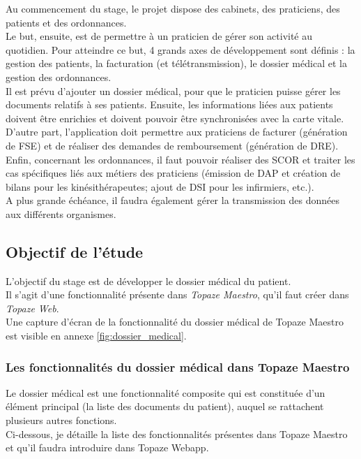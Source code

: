 Au commencement du stage, le projet dispose des cabinets, des praticiens, des patients et des ordonnances.\\

Le but, ensuite, est de permettre à un praticien de gérer son activité au quotidien. Pour atteindre ce but, 4 grands axes de développement sont définis : la gestion des patients, la facturation (et télétransmission), le dossier médical et la gestion des ordonnances.\\

Il est prévu d'ajouter un dossier médical, pour que le praticien puisse gérer les documents relatifs à ses patients. Ensuite, les informations liées aux patients doivent être enrichies et doivent pouvoir être synchronisées avec la carte vitale. D'autre part, l'application doit permettre aux praticiens de facturer (génération de \gls{FSE}) et de réaliser des demandes de remboursement (génération de \gls{DRE}). Enfin, concernant les ordonnances, il faut pouvoir réaliser des \gls{SCOR} et traiter les cas spécifiques liés aux métiers des praticiens (émission de \gls{DAP} et création de bilans pour les kinésithérapeutes; ajout de \gls{DSI} pour les infirmiers, etc.). \\

A plus grande échéance, il faudra également gérer la transmission des données aux différents organismes.

\subsection{Objectif de l'étude}

L'objectif du stage est de développer le dossier médical du patient.\\ 
Il s'agit d'une fonctionnalité présente dans \textit{Topaze Maestro}, qu'il faut créer dans \textit{Topaze Web}.\\
Une capture d'écran de la fonctionnalité du dossier médical de Topaze Maestro est visible en annexe \ref{fig:dossier_medical}.


\subsubsection{Les fonctionnalités du dossier médical dans Topaze Maestro}
Le dossier médical est une fonctionnalité composite qui est constituée d'un élément principal (la liste des documents du patient), auquel se rattachent plusieurs autres fonctions.\\
Ci-dessous, je détaille la liste des fonctionnalités présentes dans Topaze Maestro et qu'il faudra introduire dans Topaze Webapp.

